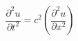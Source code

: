 \documentclass{ltjsarticle}
\begin{document}
\[ \frac{\partial^2 u}{\partial t^2} = c^2 \left( \frac{\partial^2 u}{\partial x^2} \right) \]
\end{document}
